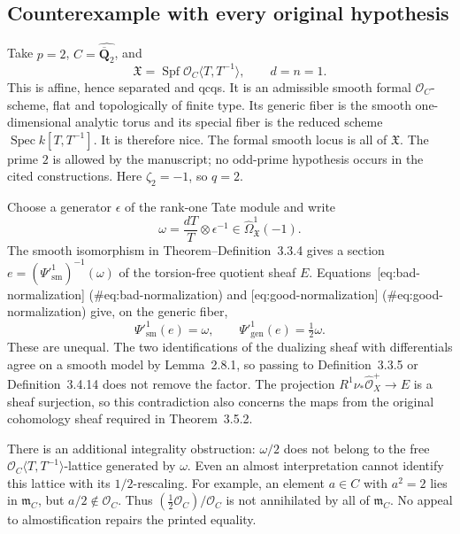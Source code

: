 \documentclass[10pt]{article}
\begin{document}
\subsection*{Counterexample with every original hypothesis}
Take \(p=2\), \(C=\widehat{\overline{\mathbf Q}_2}\), and \[\mathfrak X=\operatorname{Spf}\mathcal O_C\langle T,T^{-1}\rangle,\qquad d=n=1.\] This is affine, hence separated and qcqs. It is an admissible smooth formal \(\mathcal O_C\)-scheme, flat and topologically of finite type. Its generic fiber is the smooth one-dimensional analytic torus and its special fiber is the reduced scheme \(\operatorname{Spec}k[T,T^{-1}]\). It is therefore nice. The formal smooth locus is all of \(\mathfrak X\). The prime \(2\) is allowed by the manuscript; no odd-prime hypothesis occurs in the cited constructions. Here \(\zeta_2=-1\), so \(q=2\).\par
Choose a generator \(\epsilon\) of the rank-one Tate module and write \[\omega=\frac{dT}{T}\otimes\epsilon^{-1}
 \in\widehat\Omega^1_{\mathfrak X}(-1).\] The smooth isomorphism in Theorem–Definition 3.3.4 gives a section \(e=(\Psi'^1_{\mathrm{sm}})^{-1}(\omega)\) of the torsion-free quotient sheaf \(E\). Equations [eq:bad-normalization] (\#eq:bad-normalization) and [eq:good-normalization] (\#eq:good-normalization) give, on the generic fiber, \[\Psi'^1_{\mathrm{sm}}(e)=\omega,\qquad
\Psi'^1_{\mathrm{gen}}(e)=\tfrac12\omega.\] These are unequal. The two identifications of the dualizing sheaf with differentials agree on a smooth model by Lemma 2.8.1, so passing to Definition 3.3.5 or Definition 3.4.14 does not remove the factor. The projection \(R^1\nu_*\widehat{\mathcal O}_X^+\to E\) is a sheaf surjection, so this contradiction also concerns the maps from the original cohomology sheaf required in Theorem 3.5.2.\par
There is an additional integrality obstruction: \(\omega/2\) does not belong to the free \(\mathcal O_C\langle T,T^{-1}\rangle\)-lattice generated by \(\omega\). Even an almost interpretation cannot identify this lattice with its \(1/2\)-rescaling. For example, an element \(a\in C\) with \(a^2=2\) lies in \(\mathfrak m_C\), but \(a/2\notin\mathcal O_C\). Thus \((\tfrac12\mathcal O_C)/\mathcal O_C\) is not annihilated by all of \(\mathfrak m_C\). No appeal to almostification repairs the printed equality.\par
\end{document}
